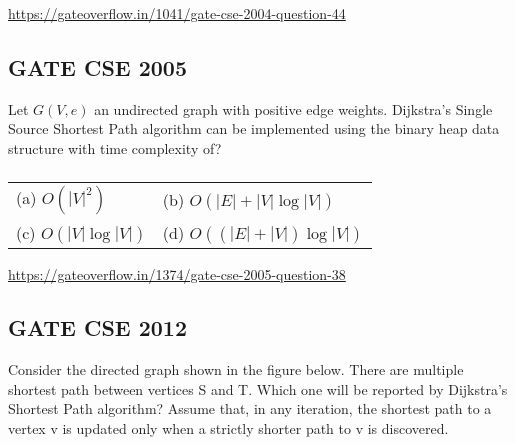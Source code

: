 \documentclass[14pt,a4paper]{extarticle}
\begin{document}
\url{https://gateoverflow.in/1041/gate-cse-2004-question-44}

\subsection{GATE CSE 2005}
Let $G(V, e)$ an undirected graph with positive edge weights. Dijkstra's Single Source
Shortest Path algorithm can be implemented using the binary heap data structure with 
time complexity of?
\subsubsection*{}
\begin{tabular}{ll}
(a) $O\left(|V|^2\right)$ \hspace{4cm} & (b) $O\left(|E|+|V|\log |V|\right)$ \\
(c) $O\left(|V|\log|V|\right)$ \hspace{4cm} & (d) $O\left(\left(|E|+|V|\right)\log|V|\right)$ \\
\end{tabular}
\vspace{0.5cm}

\url{https://gateoverflow.in/1374/gate-cse-2005-question-38}


\newpage
\subsection{GATE CSE 2012}
Consider the directed graph shown in the figure below. There are 
multiple shortest path between vertices S and T. Which one 
will be reported by Dijkstra's Shortest Path algorithm?
Assume that, in any iteration, the shortest path to a vertex v is 
updated only when a strictly shorter path to v is 
discovered.

\end{document}

